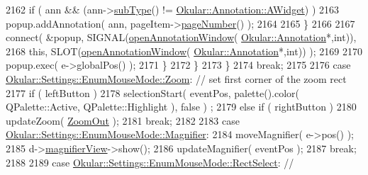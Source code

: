 \begin{DoxyCode}
2162                             \textcolor{keywordflow}{if} ( ann && (ann->\hyperlink{classOkular_1_1Annotation_af9833449767eacd740f377e69a1fdd48}{subType}() != 
      \hyperlink{classOkular_1_1Annotation_af71b46e37d5f850b97d5c4de3be9aac0aa0f6a560b971fe69d18156176258d6c8}{Okular::Annotation::AWidget}) )
2163                                 popup.addAnnotation( ann, pageItem->\hyperlink{classPageViewItem_ad75aab4c1ffd842bd5d54c0cfe84d1bf}{pageNumber}() );
2164 
2165                         \}
2166 
2167                         connect( &popup, SIGNAL(\hyperlink{classPageView_aae69bcd4740466f5af216c97f1c12f14}{openAnnotationWindow}(
      \hyperlink{classOkular_1_1Annotation}{Okular::Annotation}*,\textcolor{keywordtype}{int})),
2168                                  \textcolor{keyword}{this}, SLOT(\hyperlink{classPageView_aae69bcd4740466f5af216c97f1c12f14}{openAnnotationWindow}(
      \hyperlink{classOkular_1_1Annotation}{Okular::Annotation}*,\textcolor{keywordtype}{int})) );
2169 
2170                         popup.exec( e->globalPos() );
2171                     \}
2172                 \}
2173             \}
2174             \textcolor{keywordflow}{break};
2175 
2176         \textcolor{keywordflow}{case} \hyperlink{classOkular_1_1Settings_1_1EnumMouseMode_ab2ae04e2d7d069f02195ccf32c52415ba02b6269995c57d3fa3c40c5301591e62}{Okular::Settings::EnumMouseMode::Zoom}:     \textcolor{comment}{// set first
       corner of the zoom rect}
2177             \textcolor{keywordflow}{if} ( leftButton )
2178                 selectionStart( eventPos, palette().color( QPalette::Active, QPalette::Highlight ), \textcolor{keyword}{false} )
      ;
2179             \textcolor{keywordflow}{else} \textcolor{keywordflow}{if} ( rightButton )
2180                 updateZoom( \hyperlink{classPageView_af489dc2492677bb4f422660627f62aeca87c22d03f79c9cac97b85a7481c5e521}{ZoomOut} );
2181             \textcolor{keywordflow}{break};
2182 
2183         \textcolor{keywordflow}{case} \hyperlink{classOkular_1_1Settings_1_1EnumMouseMode_ab2ae04e2d7d069f02195ccf32c52415bab95111677f0c566414f48ece94ce0f45}{Okular::Settings::EnumMouseMode::Magnifier}:
2184             moveMagnifier( e->pos() );
2185             d->\hyperlink{classPageViewPrivate_aee1dfa250e17ccbf107395f2fe733958}{magnifierView}->show();
2186             updateMagnifier( eventPos );
2187             \textcolor{keywordflow}{break};
2188 
2189         \textcolor{keywordflow}{case} \hyperlink{classOkular_1_1Settings_1_1EnumMouseMode_ab2ae04e2d7d069f02195ccf32c52415baa9bf3100d0e93abfec2769957743e6a2}{Okular::Settings::EnumMouseMode::RectSelect}:   \textcolor{comment}{//
}
\end{DoxyCode}
